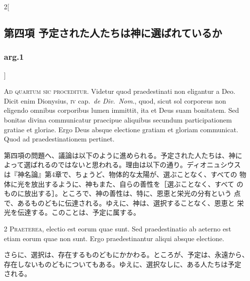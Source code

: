 \documentclass[paper=a4paper,fontsize=10pt,jafontsize=9pt,titlepage]{jlreq}
\begin{document}
\newpage







\begin{paracol}{2}[\subsection{第四項 予定された人たちは神に選ばれているか}\subsubsection{arg.1}]

{\Huge A}{\scshape d quartum sic proceditur}. Videtur quod
 praedestinati non eligantur a Deo. Dicit enim Dionysius, {\scshape iv} cap.~{\itshape de Div.~Nom}., quod, sicut sol corporeus non eligendo omnibus corporibus
 lumen immittit, ita et Deus suam bonitatem. Sed bonitas divina
 communicatur praecipue aliquibus secundum participationem gratiae et
 gloriae. Ergo Deus absque electione gratiam et gloriam communicat. Quod
 ad praedestinationem pertinet.


\switchcolumn


第四項の問題へ、議論は以下のように進められる。予定された人たちは、神に
よって選ばれるのではないと思われる。理由は以下の通り。ディオニュシウス
は『神名論』第4章で、ちょうど、物体的な太陽が、選ぶことなく、すべての
物体に光を放出するように、神もまた、自らの善性を［選ぶことなく、すべて
のものに放出する］。ところで、神の善性は、特に、恩恵と栄光の分有という
点で、あるものどもに伝達される。ゆえに、神は、選択することなく、恩恵と
栄光を伝達する。このことは、予定に属する。




{\scshape 2 Praeterea}, electio est eorum quae sunt. Sed
 praedestinatio ab aeterno est etiam eorum quae non sunt. Ergo
 praedestinantur aliqui absque electione.


\switchcolumn


さらに、選択は、存在するものどもにかかわる。ところが、予定は、永遠から、
存在しないものどもについてもある。ゆえに、選択なしに、ある人たちは予定
される。





\end{paracol}
\end{document}
